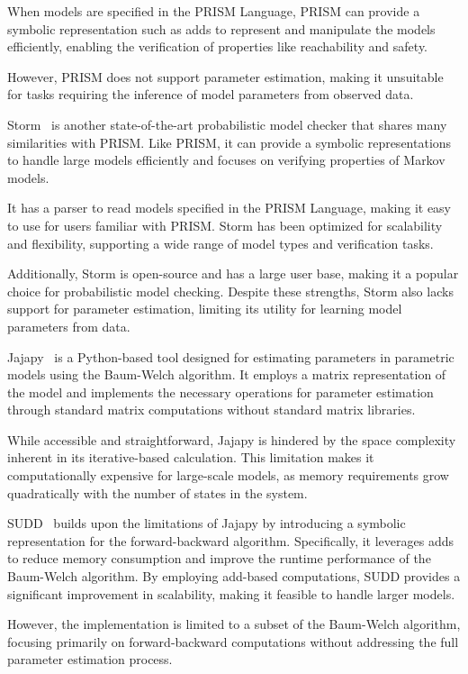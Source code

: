 When models are specified in the PRISM Language, PRISM can provide a symbolic representation such as \glspl{add} to represent and manipulate the models efficiently, enabling the verification of properties like reachability and safety.

However, PRISM does not support parameter estimation, making it unsuitable for tasks requiring the inference of model parameters from observed data.

Storm~\cite{hensel2021probabilistic} is another state-of-the-art probabilistic model checker that shares many similarities with PRISM.
Like PRISM, it can provide a symbolic representations to handle large models efficiently and focuses on verifying properties of Markov models.

It has a parser to read models specified in the PRISM Language, making it easy to use for users familiar with PRISM.
Storm has been optimized for scalability and flexibility, supporting a wide range of model types and verification tasks.

Additionally, Storm is open-source and has a large user base, making it a popular choice for probabilistic model checking.
Despite these strengths, Storm also lacks support for parameter estimation, limiting its utility for learning model parameters from data.

Jajapy~\cite{reynouard2023jajapy} is a Python-based tool designed for estimating parameters in parametric models using the Baum-Welch algorithm.
It employs a matrix representation of the model and implements the necessary operations for parameter estimation through standard matrix computations without standard matrix libraries.

While accessible and straightforward, Jajapy is hindered by the space complexity inherent in its iterative-based calculation.
This limitation makes it computationally expensive for large-scale models, as memory requirements grow quadratically with the number of states in the system.

SUDD~\cite{p7} builds upon the limitations of Jajapy by introducing a symbolic representation for the forward-backward algorithm.
Specifically, it leverages \glspl{add} to reduce memory consumption and improve the runtime performance of the Baum-Welch algorithm.
By employing \gls{add}-based computations, SUDD provides a significant improvement in scalability, making it feasible to handle larger models.

However, the implementation is limited to a subset of the Baum-Welch algorithm, focusing primarily on forward-backward computations without addressing the full parameter estimation process.

